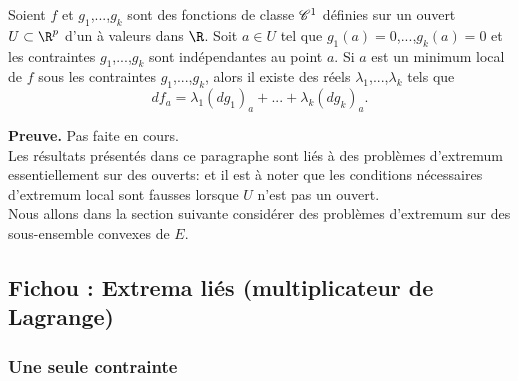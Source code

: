 \documentclass[12pt, class=report,crop=false]{standalone}
\begin{document}
{{{\begin{theoreme}
\textcolor[rgb]{0.44,0.00,0.87}{
  Soient $f$ et $g_1$,...,$g_k$ sont des fonctions de classe $\mathscr{C}^1$ d\'efinies sur un ouvert $U\subset \R^p$ d'un
 \`a valeurs dans $\R$. Soit $a \in U$ tel que  $g_1(a)=0$,...,$g_k(a)=0$ et les contraintes
$g_1$,...,$g_k$ sont ind\'ependantes au point $a$. Si $a$ est un minimum local de $f$ sous les contraintes
$g_1$,...,$g_k$, alors il existe des r\'eels $\lambda_1$,...,$\lambda_k$ tels que
\begin{equation*}
  df_a=\lambda_1 (dg_1)_a+...+\lambda_k (dg_k)_a.
\end{equation*}}
\end{theoreme}


{\textbf{Preuve.}} Pas faite en cours.\\
Les r\'esultats pr\'esent\'es dans ce paragraphe sont li\'es \`a des probl\`emes d'extremum essentiellement
sur des ouverts: et il est \`a noter que les conditions n\'ecessaires d'extremum local sont fausses
lorsque $U$ n'est pas un ouvert. \\
Nous allons dans la section suivante consid\'erer des probl\`emes d'extremum sur des sous-ensemble convexes de $E$.




\subsection{Fichou : Extrema liés (multiplicateur de Lagrange)}

\subsubsection{Une seule contrainte}

}}}
\end{document}
